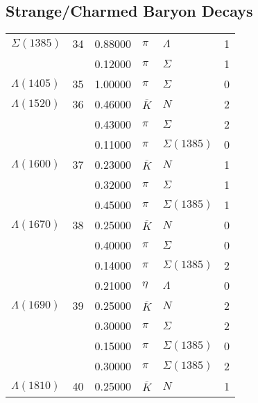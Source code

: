 \documentclass[a4paper,10pt]{article}
\begin{document}
\subsection{Strange/Charmed Baryon Decays}
\begin{tabular}[t]{lrllll} 
\toprule
$      \Sigma(1385)  $& 34& 0.88000&$ \pi                 $ &$ \Lambda             $& 1\\
$                    $&   & 0.12000&$ \pi                 $ &$ \Sigma              $& 1\\
\midrule
$      \Lambda(1405) $& 35& 1.00000&$ \pi                 $ &$ \Sigma              $& 0\\
\midrule
$      \Lambda(1520) $& 36& 0.46000&$ \overline{K}        $ &$ N                   $& 2\\
$                    $&   & 0.43000&$ \pi                 $ &$ \Sigma              $& 2\\
$                    $&   & 0.11000&$ \pi                 $ &$ \Sigma(1385)        $& 0\\
\midrule
$      \Lambda(1600) $& 37& 0.23000&$ \overline{K}        $ &$ N                   $& 1\\
$                    $&   & 0.32000&$ \pi                 $ &$ \Sigma              $& 1\\
$                    $&   & 0.45000&$ \pi                 $ &$ \Sigma(1385)        $& 1\\
\midrule
$      \Lambda(1670) $& 38& 0.25000&$ \overline{K}        $ &$ N                   $& 0\\
$                    $&   & 0.40000&$ \pi                 $ &$ \Sigma              $& 0\\
$                    $&   & 0.14000&$ \pi                 $ &$ \Sigma(1385)        $& 2\\
$                    $&   & 0.21000&$ \eta                $ &$ \Lambda             $& 0\\
\midrule
$      \Lambda(1690) $& 39& 0.25000&$ \overline{K}        $ &$ N                   $& 2\\
$                    $&   & 0.30000&$ \pi                 $ &$ \Sigma              $& 2\\
$                    $&   & 0.15000&$ \pi                 $ &$ \Sigma(1385)        $& 0\\
$                    $&   & 0.30000&$ \pi                 $ &$ \Sigma(1385)        $& 2\\
\midrule
$      \Lambda(1810) $& 40& 0.25000&$ \overline{K}        $ &$ N                   $& 1\\

\end{tabular}
\end{document}
